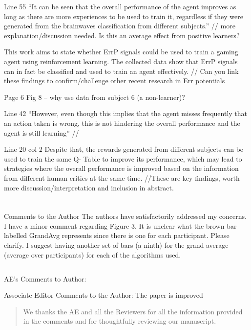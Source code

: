 \documentclass[journal,onecolumn,12pt]{IEEEtran}
\begin{document}
Line 55 “It can be seen that the overall performance of the agent improves as long as there are more experiences to be used to train it, regardless if they were generated from the brainwaves classification from different subjects.” // more explanation/discussion needed. Is this an average effect from positive learners?


This work aims to state whether ErrP signals could be used to train a gaming agent using reinforcement learning. The collected data show that ErrP signals can in fact be classified and used to train an agent effectively. // Can you link these findings to confirm/challenge other recent research in Err potentials


Page 6
Fig 8 – why use data from subject 6 (a non-learner)?


Line 42 “However, even though this implies that the agent misses frequently that an action taken is wrong, this is not hindering the overall performance and the agent is still learning” //


Line 20 col 2 Despite that, the rewards generated from different subjects can be used to train the same Q- Table to improve its performance, which may lead to strategies where the overall performance is improved based on the information from different human critics at the same time.
//These are key findings, worth more discussion/interpretation and inclusion in abstract.



\section*{}

Comments to the Author
The authors have satisfactorily addressed my concerns. I have a minor comment regarding Figure 3. It is unclear what the brown bar labelled GrandAvg represents since there is one for each participant. Please clarify. I suggest having another set of bars (a ninth) for the grand average (average over participants) for each of the algorithms used.


\subsection*{}
AE's Comments to Author:

Associate Editor
Comments to the Author:
The paper is improved 

\begin{quotation}
{\color{blue}
We thanks the AE and all the Reviewers for all the information provided in the comments and for thoughtfully reviewing our manuscript.
}
\end{quotation}
\end{document}
